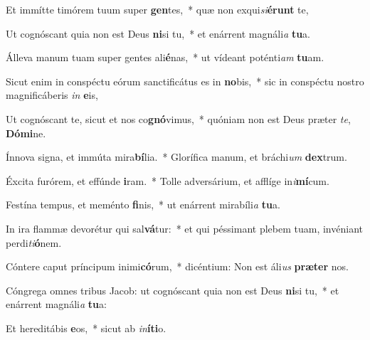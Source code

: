 \item Et immítte timórem tuum super \textbf{gen}tes,~* quæ non exqui\textit{si}\textbf{é}\textbf{runt} te,
\item Ut cognóscant quia non est Deus \textbf{ni}si tu,~* et enárrent magnáli\textit{a} \textbf{tu}a.
\item Álleva manum tuam super gentes ali\textbf{é}nas,~* ut vídeant poténti\textit{am} \textbf{tu}am.
\item Sicut enim in conspéctu eórum sanctificátus es in \textbf{no}bis,~* sic in conspéctu nostro magnificáberis \textit{in} \textbf{e}is,
\item Ut cognóscant te, sicut et nos co\textbf{gnó}vimus,~* quóniam non est Deus præter \textit{te}, \textbf{Dó}\textbf{mi}ne.
\item Ínnova signa, et immúta mira\textbf{bí}lia.~* Glorífica manum, et bráchi\textit{um} \textbf{dex}trum.
\item Éxcita furórem, et effúnde \textbf{i}ram.~* Tolle adversárium, et afflíge in\textit{i}\textbf{mí}cum.
\item Festína tempus, et meménto \textbf{fi}nis,~* ut enárrent mirabíli\textit{a} \textbf{tu}a.
\item In ira flammæ devorétur qui sal\textbf{vá}tur:~* et qui péssimant plebem tuam, invéniant perdi\textit{ti}\textbf{ó}nem.
\item Cóntere caput príncipum inimi\textbf{có}rum,~* dicéntium: Non est áli\textit{us} \textbf{præ}\textbf{ter} nos.
\item Cóngrega omnes tribus Jacob: ut cognóscant quia non est Deus \textbf{ni}si tu,~* et enárrent magnáli\textit{a} \textbf{tu}a:
\item Et hereditábis \textbf{e}os,~* sicut ab \textit{in}\textbf{í}\textbf{ti}o.
